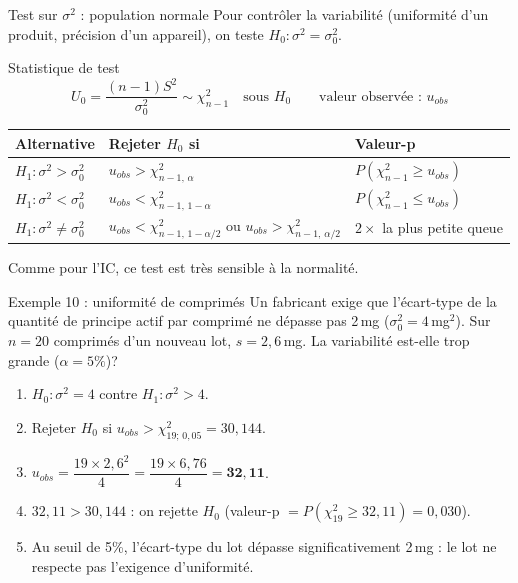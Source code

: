 \documentclass{BeamerTemplate}
\begin{document}
\begin{frame}[t]{Test sur $\sigma^2$ : population normale}
  Pour contrôler la \alert{variabilité} (uniformité d'un produit, précision d'un appareil), on teste $H_0 : \sigma^2 = \sigma_0^2$.

  \begin{Boite}{Statistique de test}
    \vspace{-2mm}
    $$U_0 = \frac{(n-1)S^2}{\sigma_0^2} \sim \chi^2_{n-1} \quad \text{sous } H_0 \qquad \text{valeur observée : } u_{obs}$$
  \end{Boite}

  \vspace{-3mm}
  \centering
  \renewcommand{\arraystretch}{1.3}
  \small
  \begin{tabular}{lll}\toprule
    \textbf{Alternative} & \textbf{Rejeter $H_0$ si} & \textbf{Valeur-p} \\ \midrule
    $H_1 : \sigma^2 > \sigma_0^2$ & $u_{obs} > \chi^2_{n-1,\,\alpha}$ & $P(\chi^2_{n-1} \ge u_{obs})$ \\
    $H_1 : \sigma^2 < \sigma_0^2$ & $u_{obs} < \chi^2_{n-1,\,1-\alpha}$ & $P(\chi^2_{n-1} \le u_{obs})$ \\
    $H_1 : \sigma^2 \ne \sigma_0^2$ & $u_{obs} < \chi^2_{n-1,\,1-\alpha/2}$ ou $u_{obs} > \chi^2_{n-1,\,\alpha/2}$ & $2 \times$ la plus petite queue \\ \bottomrule
  \end{tabular}

  \raggedright
  \small Comme pour l'IC, ce test est \alert{très sensible à la normalité}.
\end{frame}

\begin{frame}[t]{Exemple 10 : uniformité de comprimés}
  Un fabricant exige que l'écart-type de la quantité de principe actif par comprimé ne dépasse pas \alert{2\,mg} ($\sigma_0^2 = 4$\,mg$^2$). Sur $n = 20$ comprimés d'un nouveau lot, $s = 2{,}6$\,mg. La variabilité est-elle trop grande ($\alpha = 5\%$)?

  \medskip
  \begin{enumerate}\itemsep 1.5mm
    \item<2-> $H_0 : \sigma^2 = 4$ contre $H_1 : \sigma^2 > 4$.
    \item<3-> Rejeter $H_0$ si $u_{obs} > \chi^2_{19;\,0{,}05} = 30{,}144$.
    \item<4-> $u_{obs} = \dfrac{19 \times 2{,}6^2}{4} = \dfrac{19 \times 6{,}76}{4} = \mathbf{32{,}11}$.
    \item<5-> $32{,}11 > 30{,}144$ : on \alert{rejette $H_0$} (valeur-p $= P(\chi^2_{19} \ge 32{,}11) = 0{,}030$).
    \item<6-> Au seuil de 5\%, l'écart-type du lot dépasse significativement 2\,mg : le lot ne respecte pas l'exigence d'uniformité.
  \end{enumerate}

  \medskip
\end{frame}
\end{document}
